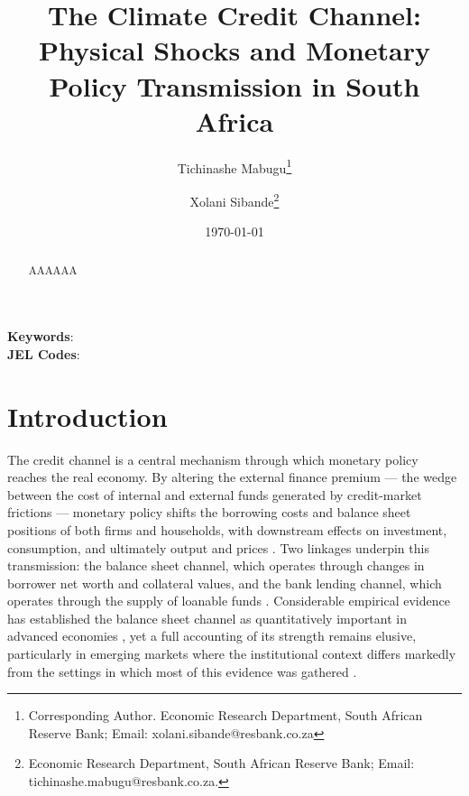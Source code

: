 \documentclass[
  letterpaper,
  DIV=11,
  numbers=noendperiod]{scrartcl}
\author{}
\date{}
\let\oldsection\section
\renewcommand\section{\oldsection}
\begin{document}
\title{The Climate Credit Channel: Physical Shocks and Monetary Policy Transmission in South Africa}





\author { Tichinashe Mabugu\footnote{Corresponding Author. Economic Research Department, South African Reserve Bank; Email: xolani.sibande@resbank.co.za} \and Xolani Sibande\footnote{Economic Research Department, South African Reserve Bank; Email: tichinashe.mabugu@resbank.co.za.}} 


\date{\today}
\maketitle

\begin{abstract}
AAAAAA

\end{abstract}

\noindent\textbf{Keywords}: \\
\textbf{JEL Codes}: 
\newpage

\section{Introduction}\label{introduction}

The credit channel is a central mechanism through which monetary policy
reaches the real economy. By altering the external finance premium ---
the wedge between the cost of internal and external funds generated by
credit-market frictions --- monetary policy shifts the borrowing costs
and balance sheet positions of both firms and households, with
downstream effects on investment, consumption, and ultimately output and
prices \citep{bernanke1995}. Two linkages underpin this transmission:
the balance sheet channel, which operates through changes in borrower
net worth and collateral values, and the bank lending channel, which
operates through the supply of loanable funds \citep{hall2001}.
Considerable empirical evidence has established the balance sheet
channel as quantitatively important in advanced economies
\citep{aysun2013, altavilla2024, ashcraft2007}, yet a full accounting of
its strength remains elusive, particularly in emerging markets where the
institutional context differs markedly from the settings in which most
of this evidence was gathered \citep{pirozhkova2025}.
\end{document}
